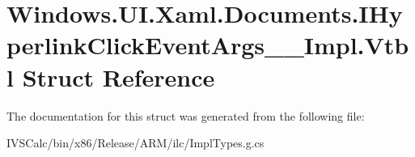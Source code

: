 \hypertarget{struct_windows_1_1_u_i_1_1_xaml_1_1_documents_1_1_i_hyperlink_click_event_args_____impl_1_1_vtbl}{}\section{Windows.\+U\+I.\+Xaml.\+Documents.\+I\+Hyperlink\+Click\+Event\+Args\+\_\+\+\_\+\+Impl.\+Vtbl Struct Reference}
\label{struct_windows_1_1_u_i_1_1_xaml_1_1_documents_1_1_i_hyperlink_click_event_args_____impl_1_1_vtbl}


The documentation for this struct was generated from the following file\+:\begin{DoxyCompactItemize}
\item 
I\+V\+S\+Calc/bin/x86/\+Release/\+A\+R\+M/ilc/Impl\+Types.\+g.\+cs\end{DoxyCompactItemize}
